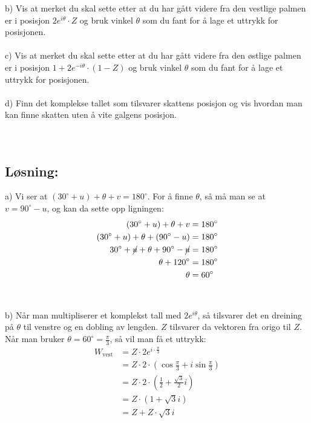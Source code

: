 \documentclass[12pt, a4paper]{article}
\begin{document}
b) Vis at merket du skal sette etter at du har gått videre fra den vestlige palmen er i posisjon
$2e^{i\theta} \cdot Z$ og bruk vinkel $\theta$ som du fant for å lage et uttrykk for posisjonen. \\\\

c) Vis at merket du skal sette etter at du har gått videre fra den østlige palmen er i posisjon
$1 + 2e^{-i\theta} \cdot (1 - Z)$ og bruk vinkel $\theta$ som du fant for å lage et uttrykk for posisjonen. \\\\

d) Finn det komplekse tallet som tilsvarer skattens posisjon og vis hvordan man kan finne skatten uten å vite galgens posisjon. \\\\\\

\subsection*{Løsning:}
a) Vi ser at $(30^\circ + u) + \theta + v = 180^\circ$. For å finne $\theta$, så må man se at $v = 90^\circ - u$, og kan da sette opp ligningen:
\begin{equation}
    \begin{split}
        (30^\circ + u) + \theta + v &= 180^\circ \\
        (30^\circ + u) + \theta + (90^\circ - u) &= 180^\circ \\
        30^\circ + \cancel{u} + \theta + 90^\circ - \cancel{u} &= 180^\circ \\
        \theta + 120^\circ  &= 180^\circ \\
        \theta &= 60^\circ
    \end{split}
\end{equation}\\\\

b) Når man multipliserer et komplekst tall med $2e^{i\theta}$, så tilsvarer det en dreining på $\theta$ til venstre og en dobling av lengden. $Z$ tilsvarer da vektoren fra origo til $Z$. \\
Når man bruker $\theta = 60^\circ = \frac{\pi}{3}$, så vil man få et uttrykk:
\begin{equation}
    \begin{split}
        W_{\text{vest}} &= Z \cdot 2e^{i \cdot \frac{\pi}{3}} \\
                 &= Z \cdot 2 \cdot (\cos{\frac{\pi}{3}} + i\sin{\frac{\pi}{3}}) \\
                 &= Z \cdot 2 \cdot (\frac{1}{2} + \frac{\sqrt{3}}{2}i) \\
                 &= Z \cdot (1 + \sqrt{3}i) \\
                 &= Z + Z \cdot \sqrt{3}i
    \end{split}
\end{equation}
\end{document}
